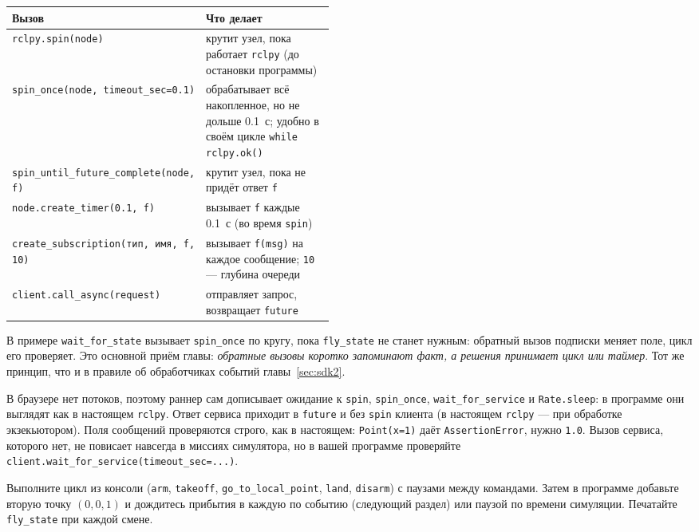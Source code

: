 \begin{center}
\small
\begin{tabularx}{\linewidth}{@{}>{\raggedright\arraybackslash}p{0.47\linewidth} X@{}}
\toprule
\textbf{Вызов} & \textbf{Что делает} \\
\midrule
\verb|rclpy.spin(node)| & крутит узел, пока работает \verb|rclpy| (до остановки программы) \\
\verb|spin_once(node, timeout_sec=0.1)| & обрабатывает всё накопленное, но не дольше 0.1~с; удобно в своём цикле \verb|while rclpy.ok()| \\
\verb|spin_until_future_complete(node, f)| & крутит узел, пока не придёт ответ \verb|f| \\
\verb|node.create_timer(0.1, f)| & вызывает \verb|f| каждые 0.1~с (во время \verb|spin|) \\
\verb|create_subscription(тип, имя, f, 10)| & вызывает \verb|f(msg)| на каждое сообщение; \verb|10| --- глубина очереди \\
\verb|client.call_async(request)| & отправляет запрос, возвращает \verb|future| \\
\bottomrule
\end{tabularx}
\end{center}

В примере \verb|wait_for_state| вызывает \verb|spin_once| по кругу, пока \verb|fly_state| не станет нужным: обратный вызов подписки меняет поле, цикл его проверяет. Это основной приём главы: \emph{обратные вызовы коротко запоминают факт, а решения принимает цикл или таймер}. Тот же принцип, что и в правиле об обработчиках событий главы~\ref{sec:sdk2}.

\begin{infobox}
В браузере нет потоков, поэтому раннер сам дописывает ожидание к \verb|spin|, \verb|spin_once|, \verb|wait_for_service| и \verb|Rate.sleep|: в программе они выглядят как в настоящем \texttt{rclpy}. Ответ сервиса приходит в \verb|future| и без \verb|spin| клиента (в настоящем \texttt{rclpy} --- при обработке экзекьютором). Поля сообщений проверяются строго, как в настоящем: \verb|Point(x=1)| даёт \verb|AssertionError|, нужно \verb|1.0|. Вызов сервиса, которого нет, не повисает навсегда в миссиях симулятора, но в вашей программе проверяйте \verb|client.wait_for_service(timeout_sec=...)|.
\end{infobox}

\begin{taskbox}
Выполните цикл из консоли (\verb|arm|, \verb|takeoff|, \verb|go_to_local_point|, \verb|land|, \verb|disarm|) с паузами между командами. Затем в программе добавьте вторую точку $(0, 0, 1)$ и дождитесь прибытия в каждую по событию (следующий раздел) или паузой по времени симуляции. Печатайте \verb|fly_state| при каждой смене.
\end{taskbox}

